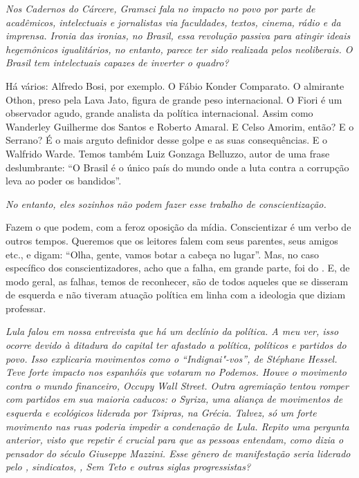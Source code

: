 \itshape
 Nos \emph{Cadernos do Cárcere}, Gramsci fala no impacto
no povo por parte de acadêmicos, intelectuais e jornalistas via
faculdades, textos, cinema, rádio e da imprensa. Ironia das ironias, no
Brasil, essa revolução passiva para atingir ideais hegemônicos
igualitários, no entanto, parece ter sido realizada pelos neoliberais. O
Brasil tem intelectuais capazes de inverter o quadro?

\normalfont 
Há vários: Alfredo Bosi, por exemplo. O Fábio Konder
Comparato. O almirante Othon, preso pela Lava Jato, figura de grande
peso internacional. O Fiori é um observador agudo, grande analista da
política internacional. Assim como Wanderley Guilherme dos Santos e
Roberto Amaral. E Celso Amorim, então? E o Serrano? É o mais arguto
definidor desse golpe e as suas consequências. E o Walfrido Warde. Temos
também Luiz Gonzaga Belluzzo, autor de uma frase deslumbrante: ``O
Brasil é o único país do mundo onde a luta contra a corrupção leva ao
poder os bandidos''.

\itshape
 No entanto, eles sozinhos não podem fazer esse trabalho
de conscientização.

\normalfont 
Fazem o que podem, com a feroz oposição da mídia.
Conscientizar é um verbo de outros tempos. Queremos que os leitores
falem com seus parentes, seus amigos etc., e digam: ``Olha, gente, vamos
botar a cabeça no lugar''. Mas, no caso específico dos
conscientizadores, acho que a falha, em grande parte, foi do . E, de
modo geral, as falhas, temos de reconhecer, são de todos aqueles que se
disseram de esquerda e não tiveram atuação política em linha com a
ideologia que diziam professar.

\itshape
 Lula falou em nossa entrevista que há um declínio da
política. A meu ver, isso ocorre devido à ditadura do capital ter
afastado a política, políticos e partidos do povo. Isso explicaria
movimentos como o ``Indignai"-vos'', de Stéphane Hessel. Teve forte
impacto nos espanhóis que votaram no Podemos. Houve o movimento contra o
mundo financeiro, Occupy Wall Street. Outra agremiação tentou romper com
partidos em sua maioria caducos: o Syriza, uma aliança de movimentos de
esquerda e ecológicos liderada por Tsipras, na Grécia. Talvez, só um
forte movimento nas ruas poderia impedir a condenação de Lula. Repito
uma pergunta anterior, visto que repetir é crucial para que as pessoas
entendam, como dizia o pensador do século  Giuseppe Mazzini. Esse
gênero de manifestação seria liderado pelo , sindicatos, , Sem Teto
e outras siglas progressistas?


